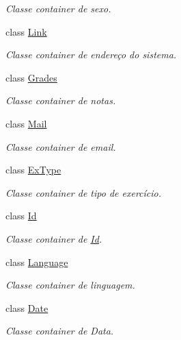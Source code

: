 \begin{DoxyCompactItemize}
\begin{DoxyCompactList}\small\item\em Classe container de sexo. \end{DoxyCompactList}\item 
class \hyperlink{classELO_1_1BaseUnit_1_1Link}{Link}
\begin{DoxyCompactList}\small\item\em Classe container de endereço do sistema. \end{DoxyCompactList}\item 
class \hyperlink{classELO_1_1BaseUnit_1_1Grades}{Grades}
\begin{DoxyCompactList}\small\item\em Classe container de notas. \end{DoxyCompactList}\item 
class \hyperlink{classELO_1_1BaseUnit_1_1Mail}{Mail}
\begin{DoxyCompactList}\small\item\em Classe container de email. \end{DoxyCompactList}\item 
class \hyperlink{classELO_1_1BaseUnit_1_1ExType}{Ex\-Type}
\begin{DoxyCompactList}\small\item\em Classe container de tipo de exercício. \end{DoxyCompactList}\item 
class \hyperlink{classELO_1_1BaseUnit_1_1Id}{Id}
\begin{DoxyCompactList}\small\item\em Classe container de \hyperlink{classELO_1_1BaseUnit_1_1Id}{Id}. \end{DoxyCompactList}\item 
class \hyperlink{classELO_1_1BaseUnit_1_1Language}{Language}
\begin{DoxyCompactList}\small\item\em Classe container de linguagem. \end{DoxyCompactList}\item 
class \hyperlink{classELO_1_1BaseUnit_1_1Date}{Date}
\begin{DoxyCompactList}\small\item\em Classe container de Data. \end{DoxyCompactList}\end{DoxyCompactItemize}
